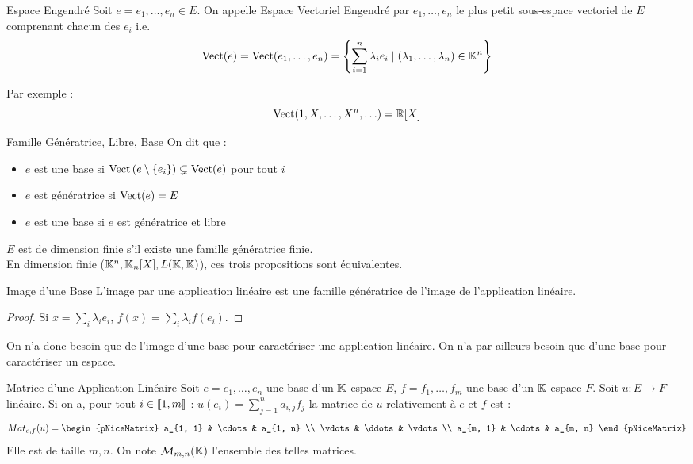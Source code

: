 \documentclass{cours}
\begin{document}
\begin{définition}{Espace Engendré}{}
Soit $e = e_{1}, \ldots, e_{n} \in E$. On appelle Espace Vectoriel Engendré par $e_{1},\ldots, e_{n}$ le plus petit sous-espace vectoriel de $E$ comprenant chacun des $e_{i}$ i.e.
\[
    \operatorname{Vect}(e) = \operatorname{Vect}(e_{1}, \ldots, e_{n}) = \left\{\sum_{i = 1}^{n} \lambda_{i}e_{i} \mid \left(\lambda_{1}, \ldots, \lambda_{n}\right) \in \mathbb{K}^{n}\right\}
\]
\end{définition}
Par exemple : 
\[
    \operatorname{Vect}(1, X, \ldots, X^{n}, \ldots) = \mathbb{R}[X]
\]

\begin{définition}{Famille Génératrice, Libre, Base}{}
On dit que :
\begin{itemize}
    \item $e$ est une base si $\operatorname{Vect}\left(e \setminus \{e_{i}\}\right) \subsetneq \operatorname{Vect}(e)$ pour tout $i$
    \item $e$ est génératrice si $\operatorname{Vect}(e) = E$
    \item $e$ est une base si $e$ est génératrice et libre
\end{itemize}
$E$ est de dimension finie s'il existe une famille génératrice finie. \\
En dimension finie ($\mathbb{K}^{n}, \mathbb{K}_{n}[X], L(\mathbb{K}, \mathbb{K})$), ces trois propositions sont équivalentes.
\end{définition}


    \begin{propositionfr}{Image d'une Base}{}
        L'image par une application linéaire est une famille génératrice de l'image de l'application linéaire.
    \end{propositionfr}
    \begin{proof}
            Si $x = \sum_{i} \lambda_{i}e_{i}$, $f(x) = \sum_{i}\lambda_{i}f(e_{i})$.
        \end{proof}
    On n'a donc besoin que de l'image d'une base pour caractériser une application linéaire. On n'a par ailleurs besoin que d'une base pour caractériser un espace.
\begin{définition}{Matrice d'une Application Linéaire}{}
Soit $e = e_{1}, \ldots, e_{n}$ une base d'un $\mathbb{K}$-espace $E$, $f = f_{1}, \ldots, f_{m}$ une base d'un $\mathbb{K}$-espace $F$. Soit $u : E \to F$ linéaire. Si on a, pour tout $i \in \left\llbracket 1, m\right\rrbracket$ :
$
    u(e_{i}) = \sum_{j = 1}^{n} a_{i, j}f_{j}
$
la matrice de $u$ relativement à $e$ et $f$ est : 
\[
    \mathop{Mat}\nolimits_{e, f}(u) = \begin{pNiceMatrix}
        a_{1, 1} & \cdots & a_{1, n} \\
        \vdots   & \ddots & \vdots   \\
        a_{m, 1} & \cdots & a_{m, n}
    \end{pNiceMatrix}\vspace{-10pt}
\]
Elle est de taille $m, n$. On note $\mathcal{M}_{m, n}(\mathbb{K})$ l'ensemble des telles matrices.
\end{définition}
\end{document}

